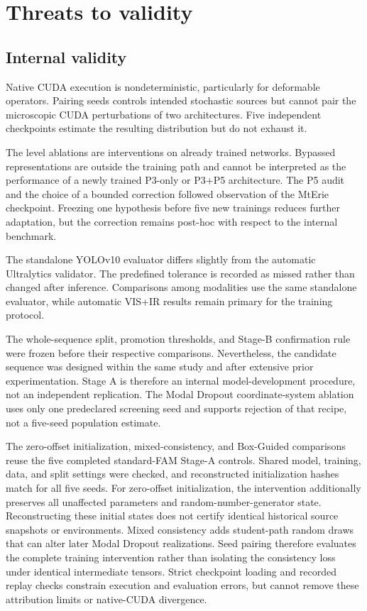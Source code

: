 \section{Threats to validity}

\subsection{Internal validity}

Native CUDA execution is nondeterministic, particularly for deformable
operators. Pairing seeds controls intended stochastic sources but cannot pair
the microscopic CUDA perturbations of two architectures. Five independent
checkpoints estimate the resulting distribution but do not exhaust it.

The level ablations are interventions on already trained networks. Bypassed
representations are outside the training path and cannot be interpreted as the
performance of a newly trained P3-only or P3+P5 architecture. The P5 audit and
the choice of a bounded correction followed observation of the MtErie
checkpoint. Freezing one hypothesis before five new trainings reduces further
adaptation, but the correction remains post-hoc with respect to the internal
benchmark.

The standalone YOLOv10 evaluator differs slightly from the automatic
Ultralytics validator. The predefined tolerance is recorded as missed rather
than changed after inference. Comparisons among modalities use the same
standalone evaluator, while automatic VIS+IR results remain primary for the
training protocol.

The whole-sequence split, promotion thresholds, and Stage-B confirmation rule
were frozen before their respective comparisons. Nevertheless, the candidate
sequence was designed within the same study and after extensive prior
experimentation. Stage A is therefore an internal model-development procedure,
not an independent replication. The Modal Dropout coordinate-system ablation
uses only one predeclared screening seed and supports rejection of that recipe,
not a five-seed population estimate.

The zero-offset initialization, mixed-consistency, and Box-Guided comparisons
reuse the five completed standard-FAM Stage-A controls. Shared model,
training, data, and split settings were checked, and reconstructed
initialization hashes match for all five
seeds. For zero-offset initialization, the intervention additionally preserves
all unaffected parameters and random-number-generator state. Reconstructing
these initial states does not certify identical historical source snapshots
or environments. Mixed consistency adds student-path random draws that can
alter later Modal Dropout realizations. Seed pairing therefore evaluates the complete
training intervention rather than isolating the consistency loss under
identical intermediate tensors. Strict checkpoint loading and recorded replay
checks constrain execution and evaluation errors, but cannot remove these
attribution limits or native-CUDA divergence.

